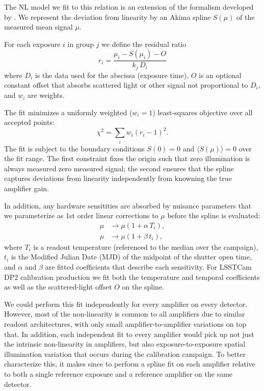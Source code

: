 The NL model we fit to this relation is an extension of the formalism developed by \citet{astier-2019}.
We represent the deviation from linearity by an Akima spline $S(\mu)$ of the measured mean signal $\mu$.

For each exposure $i$ in group $j$ we define the residual ratio
\begin{equation}
    r_i = \frac{\mu_i - S(\mu_i) - O}{k_j\, D_{i}}
    \label{eq:spline-nl-fit}
\end{equation}
where $D_{i}$ is the data used for the abscissa (exposure time), $O$ is an optional constant offset that absorbs scattered light or other signal not proportional to $D_{i}$, and $w_i$ are weights.

The fit minimizes a uniformly weighted ($w_i = 1$) least-squares objective over all accepted points:
\begin{equation}
    \chi^2 = \sum_{i} w_i \left(r_i - 1\right)^2. \label{eq:linearity-chisq}
\end{equation}
The fit is subject to the boundary conditions $S(0) = 0$ and $\langle S(\mu)\rangle = 0$ over the fit range.
The first constraint fixes the origin such that zero illumination is always measured zero measured signal; the second ensures that the spline captures deviations from linearity independently from knowning the true amplifier gain.

In addition, any hardware sensitities are absorbed by nuisance parameters that we parameterize as 1st order linear corrections to $\mu$ before the spline is evaluated:
\begin{align}
    \mu &\rightarrow \mu \left(1 + \alpha\, T_i\right), \label{eq:linearity-temp} \\
    \mu &\rightarrow \mu \left(1 + \beta\, t_i\right), \label{eq:linearity-time}
\end{align}
where $T_i$ is a readout temperature (referenced to the median over the campaign), $t_i$ is the Modified Julian Date (MJD) of the midpoint of the shutter open time, and $\alpha$ and $\beta$ are fitted coefficients that describe each sensitivity.
For LSSTCam DP2 calibration production we fit both the temperature and temporal coefficients as well as the scattered-light offset $O$ on the spline.

We could perform this fit independently for every amplifier on every detector. However, most of the non-linearity is common to all amplifiers due to similar readout architectures, with only small amplifier-to-amplifier variations on top that.
In addition, each independent fit to every amplifier would pick up not just the intrinsic non-linearity in amplifiers, but also exposure-to-exposure spatial illumination variation that occurs during the calibration campaign.
To better characterize this, it makes since to perform a spline fit on each amplifier relative to both a single reference exposure and a reference amplifier on the same detector.


